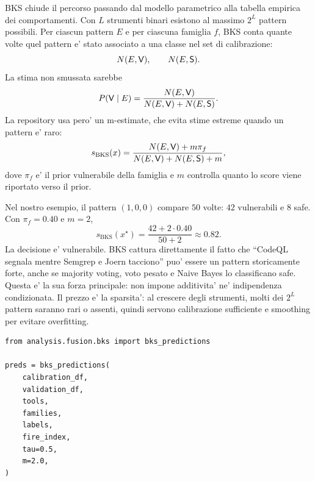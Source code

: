 BKS chiude il percorso passando dal modello parametrico alla tabella empirica dei comportamenti. Con $L$ strumenti binari esistono al massimo $2^L$ pattern possibili. Per ciascun pattern $E$ e per ciascuna famiglia $f$, BKS conta quante volte quel pattern e' stato associato a una classe nel set di calibrazione:
\begin{equation}
N(E,\mathsf{V}),\qquad N(E,\mathsf{S}).
\end{equation}
La stima non smussata sarebbe
\begin{equation}
P(\mathsf{V}\mid E)=
\frac{N(E,\mathsf{V})}{N(E,\mathsf{V})+N(E,\mathsf{S})}.
\end{equation}
La repository usa pero' un m-estimate, che evita stime estreme quando un pattern e' raro:
\begin{equation}
s_{\mathrm{BKS}}(x)=
\frac{N(E,\mathsf{V})+m\pi_f}{N(E,\mathsf{V})+N(E,\mathsf{S})+m},
\end{equation}
dove $\pi_f$ e' il prior vulnerabile della famiglia e $m$ controlla quanto lo score viene riportato verso il prior.

Nel nostro esempio, il pattern $(1,0,0)$ compare $50$ volte: $42$ vulnerabili e $8$ safe. Con $\pi_f=0.40$ e $m=2$,
\begin{equation}
s_{\mathrm{BKS}}(x^\star)=
\frac{42+2\cdot 0.40}{50+2}
\approx 0.82.
\end{equation}
La decisione e' vulnerabile. BKS cattura direttamente il fatto che ``CodeQL segnala mentre Semgrep e Joern tacciono'' puo' essere un pattern storicamente forte, anche se majority voting, voto pesato e Naive Bayes lo classificano safe. Questa e' la sua forza principale: non impone additivita' ne' indipendenza condizionata. Il prezzo e' la sparsita': al crescere degli strumenti, molti dei $2^L$ pattern saranno rari o assenti, quindi servono calibrazione sufficiente e smoothing per evitare overfitting.

\begin{lstlisting}[caption={Implementazione BKS in analysis/fusion/bks.py}]
from analysis.fusion.bks import bks_predictions

preds = bks_predictions(
    calibration_df,
    validation_df,
    tools,
    families,
    labels,
    fire_index,
    tau=0.5,
    m=2.0,
)
\end{lstlisting}
